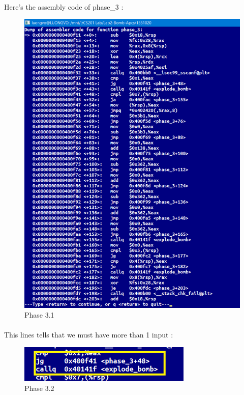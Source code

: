 \documentclass[a4paper]{article}
\begin{document}
\paragraph{}
Here's the assembly code of phase\_3 : 
\newpage
\begin{figure}[h!]
  \includegraphics[height=0.7\textheight]{bai3_1.png}
  \caption{Phase 3.1}
  \label{}
\end{figure}

\paragraph{}
This lines tells  that we must have more than 1 input  : 
\newpage
\begin{figure}[h!]
  \includegraphics[width=\linewidth]{bai3_2.png}
  \caption{Phase 3.2}
  \label{}
\end{figure}
\end{document}

